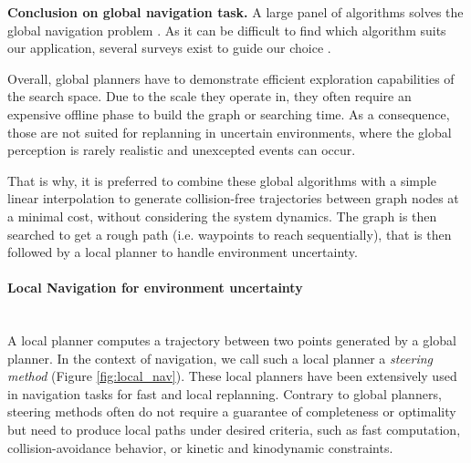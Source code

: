 

\noindent\textbf{Conclusion on global navigation task.}
A large panel of algorithms solves the global navigation problem \cite{motion_planning_latombe_1991, planning_algo_lavalle_2006, hauser_robotics_systems_draft}.
As it can be difficult to find which algorithm suits our application, several surveys exist to guide our choice \cite{yang_3D_path_planning_2016, Zammit2018ComparisonBA, patle_nav_mobile_robot_2019}.

Overall, global planners have to demonstrate efficient exploration capabilities of the search space.
Due to the scale they operate in, they often require an expensive offline phase to build the graph or searching time.
As a consequence, those are not suited for replanning in uncertain environments, where the global perception is rarely realistic and unexcepted events can occur.

That is why, it is preferred to combine these global algorithms with a simple linear interpolation to generate collision-free trajectories between graph nodes at a minimal cost, without considering the system dynamics. 
The graph is then searched to get a rough path (i.e. waypoints to reach sequentially), that is then followed by a local planner to handle environment uncertainty.



\paragraph{Local Navigation for environment uncertainty\label{subsub:nav:local}}\mbox{}\\


A local planner computes a trajectory between two points generated by a global planner.
In the context of navigation, we call such a local planner a \textit{steering method} (Figure \ref{fig:local_nav}). 
These local planners have been extensively used in navigation tasks for fast and local replanning.
Contrary to global planners, steering methods often do not require a guarantee of completeness or optimality but need to produce local paths under desired criteria, such as fast computation, collision-avoidance behavior, or kinetic and kinodynamic constraints.\\


